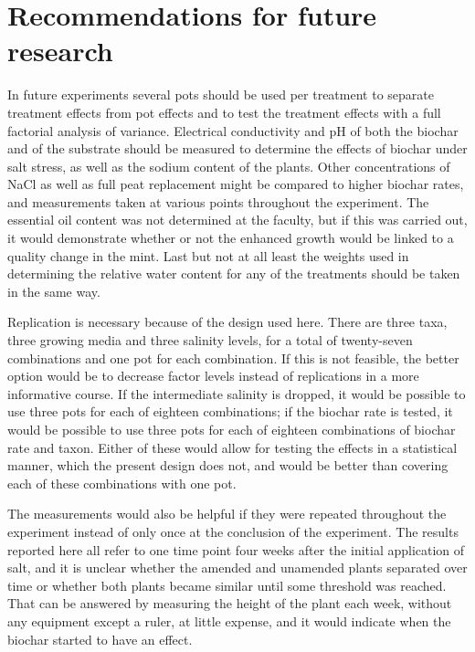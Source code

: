 \section{Recommendations for future research}

In future experiments several pots should be used per treatment to separate treatment effects from pot effects and to test the treatment effects with a full factorial analysis of variance. Electrical conductivity and pH of both the biochar and of the substrate should be measured to determine the effects of biochar under salt stress, as well as the sodium content of the plants. Other concentrations of NaCl as well as full peat replacement might be compared to higher biochar rates, and measurements taken at various points throughout the experiment. The essential oil content was not determined at the faculty, but if this was carried out, it would demonstrate whether or not the enhanced growth would be linked to a quality change in the mint. Last but not at all least the weights used in determining the relative water content for any of the treatments should be taken in the same way.

Replication is necessary because of the design used here. There are three taxa, three growing media and three salinity levels, for a total of twenty-seven combinations and one pot for each combination. If this is not feasible, the better option would be to decrease factor levels instead of replications in a more informative course. If the intermediate salinity is dropped, it would be possible to use three pots for each of eighteen combinations; if the biochar rate is tested, it would be possible to use three pots for each of eighteen combinations of biochar rate and taxon. Either of these would allow for testing the effects in a statistical manner, which the present design does not, and would be better than covering each of these combinations with one pot.

The measurements would also be helpful if they were repeated throughout the experiment instead of only once at the conclusion of the experiment. The results reported here all refer to one time point four weeks after the initial application of salt, and it is unclear whether the amended and unamended plants separated over time or whether both plants became similar until some threshold was reached. That can be answered by measuring the height of the plant each week, without any equipment except a ruler, at little expense, and it would indicate when the biochar started to have an effect.

